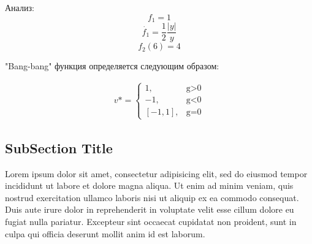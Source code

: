 Анализ:
$$f_1=1$$
$$\Dot {f_{1}}= \frac{1}{2}\frac{|y|}{y}$$
$$f_{2}(6)=4$$ 

"Bang-bang" функция определяется следующим образом:

\begin{align}
v* = 
 \begin{cases}
   1, &\text{g>0}\\
   -1, &\text{g<0}\\
   [-1,1], &\text{g=0}
 \end{cases}
\end{align}










\subsection{SubSection Title}
Lorem ipsum dolor sit amet, consectetur adipisicing elit, sed do eiusmod tempor incididunt ut labore et dolore magna aliqua. Ut enim ad minim veniam, quis nostrud exercitation ullamco laboris nisi ut aliquip ex ea commodo consequat. Duis aute irure dolor in reprehenderit in voluptate velit esse cillum dolore eu fugiat nulla pariatur. Excepteur sint occaecat cupidatat non proident, sunt in culpa qui officia deserunt mollit anim id est laborum.